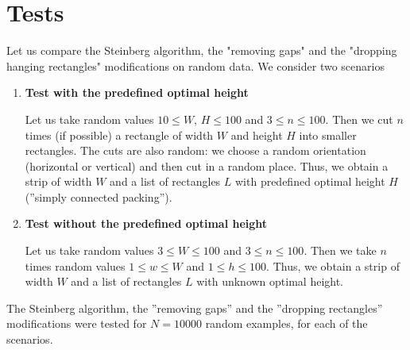 \documentclass{article}
\theoremstyle{definition}
\theoremstyle{theorem}
\numberwithin{proposition}{section}
\begin{document}
\section*{Tests}
    Let us compare the Steinberg algorithm, the "removing gaps" and the "dropping hanging rectangles" modifications on random data. We consider two scenarios 
    \begin{enumerate}
        \item\textbf{Test with the predefined optimal height}

        Let us take random values $10\leq W$, $H\leq 100$ and $3\leq n\leq 100$. Then we cut $n$ times (if possible) a rectangle of width $W$ and height $H$ into smaller rectangles. The cuts are also random: we choose a random orientation (horizontal or vertical) and then cut in a random place. Thus, we obtain a strip of width $W$ and a list of rectangles $L$ with predefined optimal height $H$ (''simply connected packing'').
        
        \item\textbf{Test without the predefined optimal height}

        Let us take random values $3\leq W\leq 100$ and $3\leq n\leq 100$. Then we take $n$ times random values $1\leq w\leq W$ and $1\leq h\leq 100$. Thus, we obtain a strip of width $W$ and a list of rectangles $L$ with unknown optimal height.
    \end{enumerate}
    The Steinberg algorithm, the ''removing gaps'' and the ''dropping rectangles'' modifications were tested for $N = 10000$ random examples, for each of the scenarios.
\end{document}
